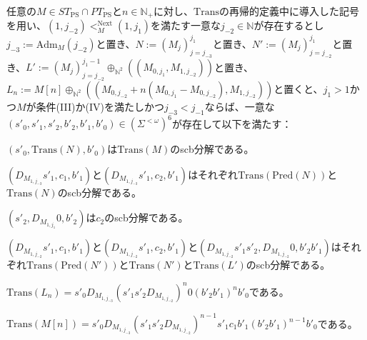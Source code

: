\documentclass[dvipdfmx,uplatex]{jsarticle}
\theoremstyle{customnonumberbreakfortheorem}
\theoremstyle{customnonumberbreakforproof}
\begin{document}
\begin{lemma}\label{条件(III)か(IV)の下での各種scb分解}
	任意の\(M \in ST_{\textrm{PS}} \cap PT_{\textrm{PS}}\)と\(n \in \mathbb{N}_{+}\)に対し、\(\textrm{Trans}\)の再帰的定義中に導入した記号を用い、\((1,j_{-2}) <_M^{\textrm{Next}} (1,j_1)\)を満たす一意な\(j_{-2} \in \mathbb{N}\)が存在するとし\(j_{-3} := \textrm{Adm}_M(j_{-2})\)と置き、\(N := (M_j)_{j=j_{-3}}^{j_1}\)と置き、\(N' := (M_j)_{j=j_{-2}}^{j_1}\)と置き、\(L' := (M_j)_{j=j_{-2}}^{j_1-1} \oplus_{\mathbb{N}^2} ((M_{0,j_1},M_{1,j_{-2}}))\)と置き、\(L_n := M[n] \oplus_{\mathbb{N}^2} ((M_{0,j_{-2}}+n(M_{0,j_1}-M_{0,j_{-2}}),M_{1,j_{-2}}))\)と置くと\footnotemark{}、\(j_1 > 1\)かつ\(M\)が条件(III)か(IV)を満たし\footnotemark{}かつ\(j_{-3} < j_{-1}\)ならば、一意な\((s'_0,s'_1,s'_2,b'_2,b'_1,b'_0) \in (\Sigma^{< \omega})^6\)が存在して以下を満たす：
	\begin{penumerate}
		\item \((s'_0,\textrm{Trans}(N),b'_0)\)は\(\textrm{Trans}(M)\)のscb分解である。
		\item \((D_{M_{1,j_{-3}}} s'_1,c_1,b'_1)\)と\((D_{M_{1,j_{-3}}} s'_1,c_2,b'_1)\)はそれぞれ\(\textrm{Trans}(\textrm{Pred}(N))\)と\(\textrm{Trans}(N)\)のscb分解である。
		\item \((s'_2,D_{M_{1,j_1}} 0,b'_2)\)は\(c_2\)のscb分解である。
		\item \((D_{M_{1,j_{-2}}} s'_1,c_1,b'_1)\)と\((D_{M_{1,j_{-2}}} s'_1,c_2,b'_1)\)と\((D_{M_{1,j_{-2}}} s'_1 s'_2,D_{M_{1,j_{-2}}} 0,b'_2 b'_1)\)はそれぞれ\(\textrm{Trans}(\textrm{Pred}(N'))\)と\(\textrm{Trans}(N')\)と\(\textrm{Trans}(L')\)のscb分解である。
		\item \(\textrm{Trans}(L_n) = s'_0 D_{M_{1,j_{-3}}} (s'_1 s'_2 D_{M_{1,j_{-2}}})^n 0 (b'_2 b'_1)^n b'_0\)である。
		\item \(\textrm{Trans}(M[n]) = s'_0 D_{M_{1,j_{-3}}} (s'_1 s'_2 D_{M_{1,j_{-2}}})^{n-1} s'_1 c_1 b'_1 (b'_2 b'_1)^{n-1} b'_0\)である。
	\end{penumerate}
\end{lemma}
\addtocounter{footnote}{-1}
\addtocounter{footnote}{1}
\end{document}
